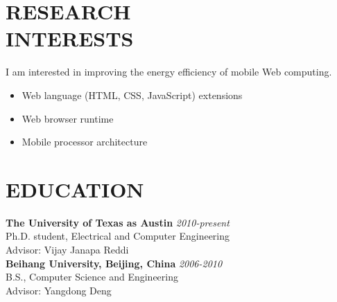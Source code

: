 \documentclass[margin, 9pt]{res} %
\begin{document}
\begin{resume}

 


\vspace*{-5pt}
\section{RESEARCH\\ INTERESTS} 

I am interested in improving the energy efficiency of mobile Web computing.
 
\begin{itemize}[noitemsep, leftmargin=*]
	\item Web language (HTML, CSS, JavaScript) extensions
	\item Web browser runtime
	\item Mobile processor architecture
\end{itemize} 


\vspace*{-5pt}
\section{EDUCATION}

\textbf{The University of Texas as Austin} \hfill\textit{2010-present}\\
Ph.D. student, Electrical and Computer Engineering\\
Advisor: Vijay Janapa Reddi\\

\vspace*{-5pt}
\textbf{Beihang University, Beijing, China} \hfill\textit{2006-2010}\\
B.S., Computer Science and Engineering\\
Advisor: Yangdong Deng


\end{resume}
\end{document}
